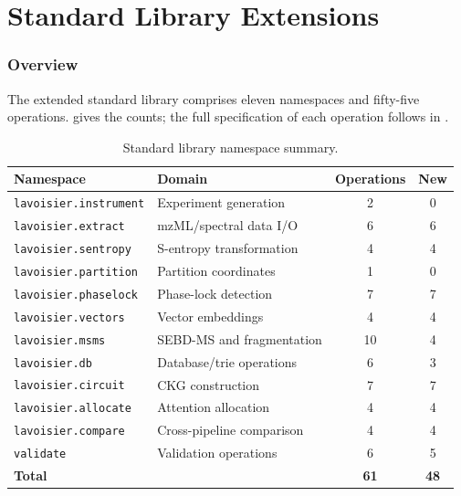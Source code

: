 \documentclass[11pt,a4paper]{article}
\theoremstyle{planstyle}
\theoremstyle{definition}
\theoremstyle{remark}
\newcommand{\shk}[1]{\texttt{#1}}
\begin{document}
\part{Standard Library Extensions}

\section{Overview}
\label{sec:stdlib-overview}

The extended standard library comprises eleven namespaces and fifty-five
operations.  gives the counts; the full
specification of each operation follows in
.

\begin{table}[htbp]
\centering
\small
\caption{Standard library namespace summary.}
\label{tab:stdlib-summary}
\begin{tabular}{@{}llcc@{}}
\toprule
\textbf{Namespace} & \textbf{Domain} & \textbf{Operations} &
\textbf{New} \\
\midrule
\shk{lavoisier.instrument}  & Experiment generation     & 2 & 0 \\
\shk{lavoisier.extract}     & mzML/spectral data I/O    & 6 & 6 \\
\shk{lavoisier.sentropy}    & S-entropy transformation  & 4 & 4 \\
\shk{lavoisier.partition}   & Partition coordinates     & 1 & 0 \\
\shk{lavoisier.phaselock}   & Phase-lock detection      & 7 & 7 \\
\shk{lavoisier.vectors}     & Vector embeddings         & 4 & 4 \\
\shk{lavoisier.msms}        & SEBD-MS and fragmentation & 10 & 4 \\
\shk{lavoisier.db}          & Database/trie operations  & 6 & 3 \\
\shk{lavoisier.circuit}     & CKG construction          & 7 & 7 \\
\shk{lavoisier.allocate}    & Attention allocation      & 4 & 4 \\
\shk{lavoisier.compare}     & Cross-pipeline comparison & 4 & 4 \\
\shk{validate}              & Validation operations     & 6 & 5 \\
\midrule
\textbf{Total}              &                           & \textbf{61} & \textbf{48} \\
\bottomrule
\end{tabular}
\end{table}
\end{document}
